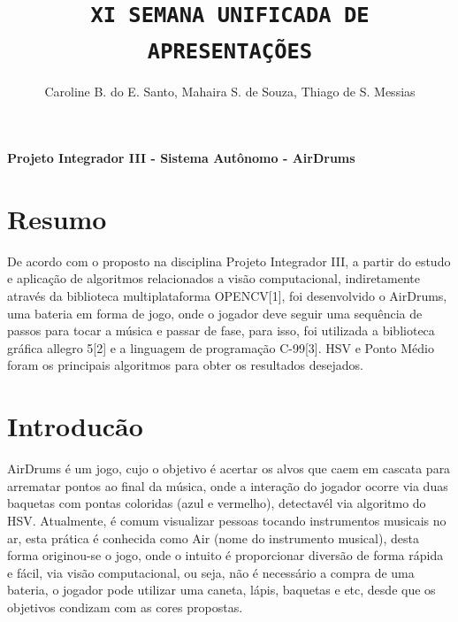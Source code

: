 \documentclass{sciposter}
\title{\Huge \texttt{{\color{NavyBlue}XI SEMANA UNIFICADA DE APRESENTAÇÕES}}}
\author{Caroline B. do E. Santo, Mahaira S. de Souza, Thiago de S. Messias}
\institute{\texttt{{\bf{\color{orange} 8 a 12 de Junho de 2015\\
Bacharelado em Ciência da Computação – Código: BCC\_PI\_III\_N\_G01}}}}
\begin{document}

\maketitle

{\center

{\bf { \huge  Projeto Integrador III - Sistema Autônomo - AirDrums} } 

}


\bf{\hrulefill}
\begin{multicols}{3}

\section {Resumo}
De acordo com o proposto na disciplina Projeto Integrador III, a partir do estudo e aplicação de algoritmos relacionados a visão computacional, indiretamente através da biblioteca multiplataforma OPENCV[1], foi desenvolvido o AirDrums, uma bateria em forma de jogo, onde o jogador deve seguir uma sequência de passos para tocar a música e passar de fase, para isso, foi utilizada a biblioteca gráfica  allegro 5[2] e a linguagem de programação C-99[3]. HSV e Ponto Médio foram os principais algoritmos para obter os resultados desejados.

\section{Introducão}
AirDrums é um jogo, cujo o objetivo é acertar os alvos que caem em cascata para arrematar pontos ao final da música, onde a interação do jogador ocorre via duas baquetas com pontas coloridas (azul e vermelho), detectavél via algoritmo do HSV.
Atualmente, é comum visualizar pessoas tocando instrumentos musicais no ar, esta prática é conhecida como Air (nome do instrumento musical), desta forma originou-se o jogo, onde o intuito é proporcionar diversão de forma rápida e fácil, via visão computacional, ou seja, não é necessário a compra de uma bateria, o jogador pode utilizar uma caneta, lápis, baquetas e etc, desde que os objetivos condizam com as cores propostas. 


\end{multicols}
\end{document}

